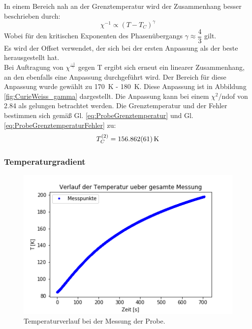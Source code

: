 \documentclass[12pt,a4paper]{article}
\begin{document}
In einem Bereich nah an der Grenztemperatur wird der Zusammenhang besser beschrieben durch:
\begin{equation*}
\chi ^{-1} \propto (T - T_C)^\gamma
\end{equation*}
Wobei für den kritischen Exponenten des Phasenübergangs $\gamma \approx \dfrac{4}{3}$ gilt. \\
Es wird der Offset verwendet, der sich bei der ersten Anpassung als der beste herausgestellt hat. \\
Bei Auftragung von $\chi ^{\frac{-1}{\gamma}}$ gegen T ergibt sich erneut ein linearer Zusammenhang, an den ebenfalls eine Anpassung durchgeführt wird. Der Bereich für diese Anpassung wurde gewählt zu \SI{170}{K} - \SI{180}{K}. Diese Anpassung ist in Abbildung \ref{fig:CurieWeiss_gamma} dargestellt. Die Anpassung kann bei einem $\chi ^2$/ndof von 2.84 als gelungen betrachtet werden. Die Grenztemperatur und der Fehler bestimmen sich gemäß Gl. \ref{eq:ProbeGrenztemperatur} und Gl. \ref{eq:ProbeGrenztemperaturFehler} zu:
\begin{equation*}
T_C^{(2)} = \SI{156,862 \pm 0,061}{K}
\end{equation*}

\subsubsection{Temperaturgradient}

\begin{figure}
\centering
\includegraphics[scale=1]{Bilder/Haupt_Probe/Temperatur_Verlauf.png}
\caption[test]{Temperaturverlauf bei der Messung der Probe.}
\label{fig:TemperaturverlaufProbe}
\end{figure}
\end{document}

